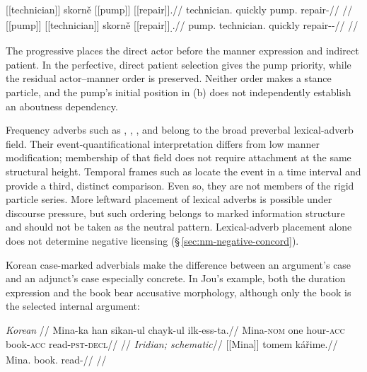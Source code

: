 \pex\label{ex:order-slot-manner-alignment}
\a
\begingl
\gla \textnormal{[[technician]]}\textsubscript{\Dir{}} skorně \textnormal{[[pump]]}\textsubscript{\Ind{}} \textnormal{[[repair]]}\textsubscript{\Prog{}}.//
\glb technician.\Dir{} quickly pump.\Ind{} repair-\Prog{}//
\glft {}
//
\endgl
\a
\begingl
\gla \textnormal{[[pump]]}\textsubscript{\Dir{}} \textnormal{[[technician]]}\textsubscript{\Trs{}} skorně \textnormal{[[repair]]}\textsubscript{\Trs{}.\Pf{}}.//
\glb pump.\Dir{} technician.\Trs{} quickly repair-\Trs{}-\Pf{}//
\glft {}
//
\endgl
\xe

The progressive places the direct actor before the manner expression and
indirect patient. In the perfective, direct patient selection gives the pump
priority, while the residual actor--manner order is preserved. Neither
order makes  a stance particle, and the pump's initial position
in (b) does not independently establish an aboutness dependency.

\noindent Frequency adverbs such as  ,
 ,  , and 
 belong to the broad preverbal lexical-adverb field. Their event-quantificational
interpretation differs from low manner modification; membership of that field
does not require attachment at the same structural height. Temporal frames
such as   locate the event in a time interval and
provide a third, distinct comparison. Even so, they are not members of the rigid particle series. More
leftward placement of lexical adverbs is possible under discourse pressure, but
such ordering belongs to marked information structure and should not be taken
as the neutral pattern. Lexical-adverb placement alone does not determine negative licensing
(§\,\ref{sec:nm-negative-concord}).

Korean case-marked adverbials make the difference between an argument's
case and an adjunct's case especially concrete. In Jou's example, both
the duration expression and the book bear accusative morphology, although
only the book is the selected internal argument:

\pex\label{ex:order-comparative-duration}
\a
\begingl
\glpreamble \textit{Korean} \cite[example~1a, p.~2]{jou2026}//
\gla Mina-ka han sikan-ul chayk-ul ilk-ess-ta.//
\glb Mina-\textsc{nom} one hour-\textsc{acc} book-\textsc{acc} read-\textsc{pst}-\textsc{decl}//
\glft {}//
\endgl
\a
\begingl
\glpreamble \textit{Iridian; schematic}//
\gla \textnormal{[[Mina]]}\textsubscript{\Dir{}} tomem kářime.//
\glb Mina.\Dir{} book.\Ind{} read-\Prog{}//
\glft {}
//
\endgl
\xe

